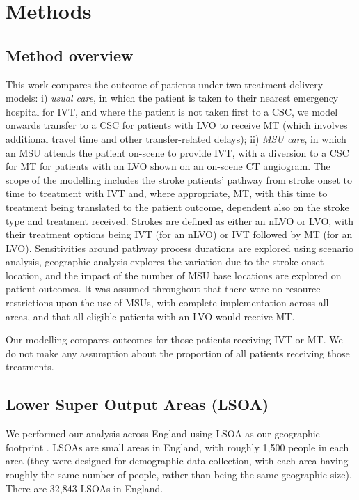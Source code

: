 \section{Methods}

\subsection{Method overview}

This work compares the outcome of patients under two treatment delivery models: i) \emph{usual care}, in which the patient is taken to their nearest emergency hospital for IVT, and where the patient is not taken first to a CSC, we model onwards transfer to a CSC for patients with LVO to receive MT (which involves additional travel time and other transfer-related delays); ii) \textit{MSU care}, in which an MSU attends the patient on-scene to provide IVT, with a diversion to a CSC for MT for patients with an LVO shown on an on-scene CT angiogram. The scope of the modelling includes the stroke patients’ pathway from stroke onset to time to treatment with IVT and, where appropriate, MT, with this time to treatment being translated to the patient outcome, dependent also on the stroke type and treatment received. Strokes are defined as either an nLVO or LVO, with their treatment options being IVT (for an nLVO) or IVT followed by MT (for an LVO). Sensitivities around pathway process durations are explored using scenario analysis, geographic analysis explores the variation due to the stroke onset location, and the impact of the number of MSU base locations are explored on patient outcomes. It was assumed throughout that there were no resource restrictions upon the use of MSUs, with complete implementation across all areas, and that all eligible patients with an LVO would receive MT.

Our modelling compares outcomes for those patients receiving IVT or MT. We do not make any assumption about the proportion of all patients receiving those treatments.

\subsection{Lower Super Output Areas (LSOA)}

We performed our analysis across England using LSOA as our geographic footprint \cite{ons}. LSOAs are small areas in England, with roughly 1,500 people in each area (they were designed for demographic data collection, with each area having roughly the same number of people, rather than being the same geographic size). There are 32,843 LSOAs in England.

